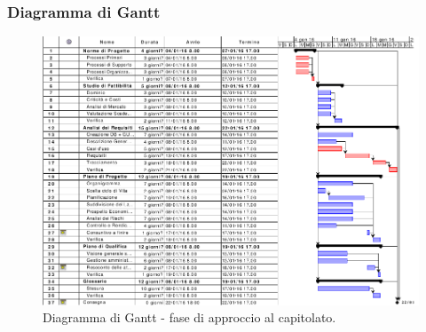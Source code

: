\documentclass[a4paper]{article}
\begin{document}
			\subsubsection{Diagramma di Gantt}
				\begin{figure}[H]
					\centering
					\includegraphics[width=\textwidth]{gantt_approccio}
					\caption{Diagramma di Gantt - fase di approccio al capitolato.}
				\end{figure}
\end{document}

